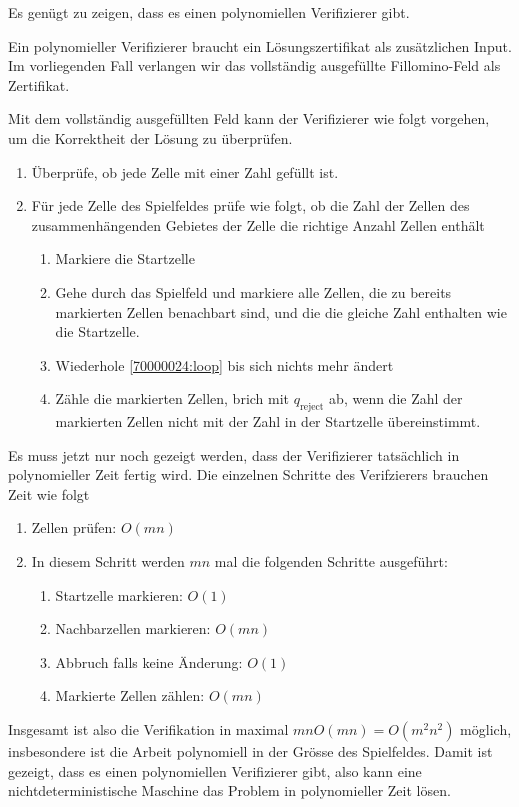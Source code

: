 \begin{loesung}
Es genügt zu zeigen, dass es einen polynomiellen Verifizierer gibt.

Ein polynomieller Verifizierer braucht ein Lösungszertifikat als 
zusätzlichen Input. Im vorliegenden Fall verlangen wir das vollständig
ausgefüllte Fillomino-Feld als Zertifikat.

Mit dem vollständig ausgefüllten Feld kann der Verifizierer wie folgt
vorgehen, um die Korrektheit der Lösung zu überprüfen.
\begin{enumerate}
\item Überprüfe, ob jede Zelle mit einer Zahl gefüllt ist.
\item Für jede Zelle des Spielfeldes prüfe wie folgt, ob die Zahl der
Zellen des zusammenhängenden Gebietes der Zelle die richtige Anzahl
Zellen enthält
\begin{enumerate}
\item Markiere die Startzelle
\item \label{70000024:loop} Gehe durch das Spielfeld und markiere alle Zellen, die zu bereits
markierten Zellen benachbart sind, und die die gleiche Zahl enthalten wie
die Startzelle.
\item Wiederhole \ref{70000024:loop} bis sich nichts mehr ändert
\item Zähle die markierten Zellen, brich mit $q_{\text{reject}}$ ab,
wenn die Zahl der markierten Zellen nicht mit der Zahl in der Startzelle
übereinstimmt.
\end{enumerate}
\end{enumerate}
Es muss jetzt nur noch gezeigt werden, dass der Verifizierer tatsächlich
in polynomieller Zeit fertig wird. Die einzelnen Schritte des Verifzierers
brauchen Zeit wie folgt
\begin{enumerate}
\item Zellen prüfen: $O(mn)$
\item In diesem Schritt werden $mn$ mal die folgenden Schritte ausgeführt:
\begin{enumerate}
\item Startzelle markieren: $O(1)$
\item Nachbarzellen markieren: $O(mn)$
\item Abbruch falls keine Änderung: $O(1)$
\item Markierte Zellen zählen: $O(mn)$
\end{enumerate}
\end{enumerate}
Insgesamt ist also die Verifikation in maximal $mnO(mn)=O(m^2n^2)$ möglich,
insbesondere ist die Arbeit polynomiell in der Grösse des Spielfeldes.
Damit ist gezeigt, dass es einen polynomiellen Verifizierer gibt,
also kann eine nichtdeterministische Maschine das Problem in polynomieller
Zeit lösen.
\end{loesung}


